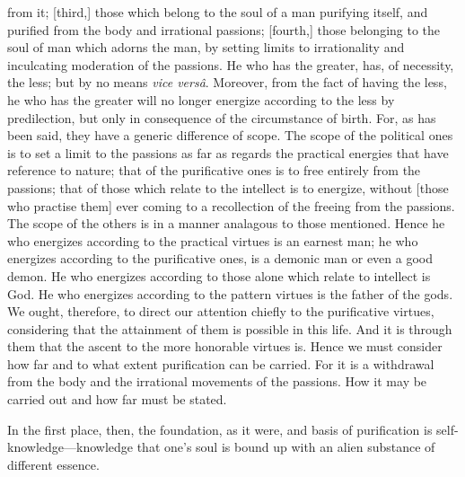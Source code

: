 \documentclass[12pt]{article}
\begin{document}
from it; [third,] those which belong to the soul of a man purifying itself, and
purified from the body and irrational passions; [fourth,] those belonging to
the soul of man which adorns the man, by setting limits to irrationality and
inculcating moderation of the passions. He who has the greater, has, of
necessity, the less; but by no means \textit{vice vers\^{a}}. Moreover, from
the fact of having the less, he who has the greater will no longer energize
according to the less by predilection, but only in consequence of the
circumstance of birth. For, as has been said, they have a generic difference of
scope. The scope of the political ones is to set a limit to the passions as far
as regards the practical energies that have reference to nature; that of the
purificative ones is to free entirely from the passions; that of those which
relate to the intellect is to energize, without [those who practise them] ever
coming to a recollection of the freeing from the passions. The scope of the
others is in a manner analagous to those mentioned. Hence he who energizes
according to the practical virtues is an earnest man; he who energizes
according to the purificative ones, is a demonic man or even a good demon. He
who energizes according to those alone which relate to intellect is God. He who
energizes according to the pattern virtues is the father of the gods. We ought,
therefore, to direct our attention chiefly to the purificative virtues,
considering that the attainment of them is possible in this life. And it is
through them that the ascent to the more honorable virtues is. Hence we must
consider how far and to what extent purification can be carried. For it is a
withdrawal from the body and the irrational movements of the passions. How it
may be carried out and how far must be stated.

In the first place, then, the foundation, as it were, and basis of purification
is self-knowl\-edge---knowledge that one's soul is bound up with an alien
substance of different essence.
\end{document}
